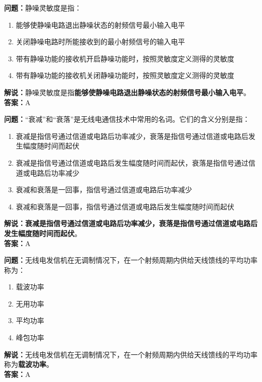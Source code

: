 \textbf{问题：}静噪灵敏度是指：

\begin{enumerate}[label=\Alph*), leftmargin=1cm]
	\item 能够使静噪电路退出静噪状态的射频信号最小输入电平
	\item 关闭静噪电路时所能接收到的最小射频信号的输入电平
	\item 带有静噪功能的接收机开启静噪功能时，按照灵敏度定义测得的灵敏度
	\item 带有静噪功能的接收机关闭静噪功能时，按照灵敏度定义测得的灵敏度
\end{enumerate}

\textbf{解说：}静噪灵敏度是指\textbf{能够使静噪电路退出静噪状态的射频信号最小输入电平}。\\\textbf{答案：}A%



\textbf{问题：}“衰减”和“衰落”是无线电通信技术中常用的名词。它们的含义分别是指：

\begin{enumerate}[label=\Alph*), leftmargin=1cm]
	\item 衰减是指信号通过信道或电路后功率减少，衰落是指信号通过信道或电路后发生幅度随时间而起伏
	\item 衰减是指信号通过信道或电路后发生幅度随时间而起伏，衰落是指信号通过信道或电路后功率减少
	\item 衰减和衰落是一回事，指信号通过信道或电路后功率减少
	\item 衰减和衰落是一回事，指信号通过信道或电路后发生幅度随时间而起伏
\end{enumerate}

\textbf{解说：}\textbf{衰减是指信号通过信道或电路后功率减少，衰落是指信号通过信道或电路后发生幅度随时间而起伏}。\\\textbf{答案：}A%



\textbf{问题：}无线电发信机在无调制情况下，在一个射频周期内供给天线馈线的平均功率称为：

\begin{enumerate}[label=\Alph*), leftmargin=1cm]
	\item 载波功率
	\item 无用功率
	\item 平均功率
	\item 峰包功率
\end{enumerate}

\textbf{解说：}无线电发信机在无调制情况下，在一个射频周期内供给天线馈线的平均功率称为\textbf{载波功率}。\\\textbf{答案：}A%




